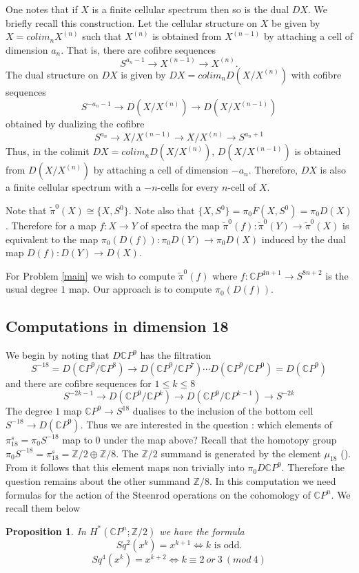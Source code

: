 \documentclass[a4paper,leqno,12pt]{amsart}
\theoremstyle{plain}
\newtheorem{prop}[theorem]{Proposition}
\theoremstyle{definition}
\numberwithin{equation}{section}
\begin{document}
One notes that if $X$ is a finite cellular spectrum then so is the dual $DX$. We briefly recall this construction. Let the cellular structure on $X$ be given by $X=\mathit{colim}_n X^{(n)}$ such that $X^{(n)}$ is obtained from $X^{(n-1)}$ by attaching a cell of dimension $a_n$. That is, there are cofibre sequences 
$$S^{a_n-1} \to X^{(n-1)} \to X^{(n)}.$$ 
The dual structure on $DX$ is given by $DX= \mathit{colim}_n D(X/X^{(n)})$ with cofibre sequences $$S^{-a_n-1} \to D(X/X^{(n)}) \to D(X/X^{(n-1)}) $$
obtained by dualizing the cofibre 
$$S^{a_n}\to X/X^{(n-1)}\to X/X^{(n)} \to S^{a_n+1}$$
Thus, in the colimit   $DX= \mathit{colim}_n D(X/X^{(n)})$, $D(X/X^{(n-1)})$ is obtained from $D(X/X^{(n)})$ by attaching a cell of dimension $-a_n$. Therefore, $DX$ is also a finite cellular spectrum with a $-n$-cells for every $n$-cell of $X$. 

Note that $\tilde{\pi}^0(X) \cong \{X,S^0\}$. Note also that $\{X,S^0\} = \pi_0 F(X,S^0) = \pi_0 D(X)$. Therefore for a map $f: X\to Y$ of spectra the map $\tilde{\pi}^0(f): \tilde{\pi}^0 (Y) \to \tilde{\pi}^0(X)$ is equivalent to the map $\pi_0(D(f)): \pi_0D(Y) \to \pi_0 D(X)$ induced by the dual map $D(f): D(Y) \to D(X)$. 

For Problem \ref{main} we wish to compute $\tilde{\pi}^0(f)$ where $f: {\mathbb{C}} P^{4n+1} \to S^{8n+2}$ is the usual degree $1$ map. Our approach is to compute $\pi_0(D(f))$. 

\subsection{Computations in dimension 18}\label{comp18}
We begin by noting that $D{\mathbb{C}} P^9$ has the filtration 
\begin{equation}\label{filt}
S^{-18}= D({\mathbb{C}} P^9/{\mathbb{C}} P^8) \to D({\mathbb{C}} P^9/{\mathbb{C}} P^7) \cdots D({\mathbb{C}} P^9/{\mathbb{C}} P^0)= D({\mathbb{C}} P^9)
\end{equation}
and there are cofibre sequences for $1\leq k \leq 8$
$$S^{-2k-1} \to D({\mathbb{C}} P^9/{\mathbb{C}} P ^{k}) \to D({\mathbb{C}} P^9/ {\mathbb{C}} P^{k-1}) \to S^{-2k}$$
The degree $1$ map ${\mathbb{C}} P^9 \to S^{18}$ dualises to the inclusion of the bottom cell $S^{-18} \to D({\mathbb{C}} P^9)$. Thus we are interested in the question : which elements of $\pi_{18}^s = \pi_0 S^{-18}$ map to $0$ under the map above? Recall that the homotopy group $\pi_0 S^{-18} = \pi_{18}^s={\mathbb{Z}}/2\oplus {\mathbb{Z}}/8$. 
The ${\mathbb{Z}}/2$ summand is generated by the element $\mu_{18}$ (\cite{Ada}). From \cite{Far-Jon} it follows that this element maps non trivially into $\pi_0 D{\mathbb{C}} P^9$. Therefore the question remains about the other summand ${\mathbb{Z}}/8$. In this computation we need formulas for the action of the Steenrod operations on the cohomology of ${\mathbb{C}} P^n$. We recall them below
\begin{prop} \label{St}
In $H^*({\mathbb{C}} P^n;{\mathbb{Z}}/2)$ we have the formula 
$$Sq^2(x^k)=x^{k+1} \iff  k \mbox{ is odd}.$$
$$Sq^4(x^k)=x^{k+2} \iff k \equiv 2~\mathit{or}~3~ (\mathit{mod}~4)$$
\end{prop}
\end{document}
